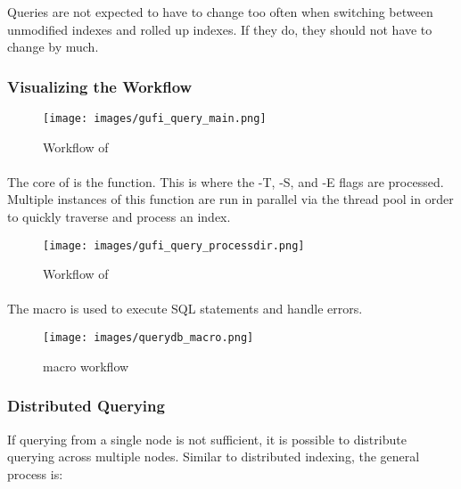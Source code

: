 Queries are not expected to have to change too often when switching
between unmodified indexes and rolled up indexes. If they do, they
should not have to change by much.

\subsubsection{Visualizing the Workflow}
\begin{figure}[H]
  \centering
  \texttt{[image: images/gufi\_query\_main.png]}
  \caption{Workflow of \gufiquery}
\end{figure}

\paragraph{\processdir}
The core of \gufiquery is the \processdir function. This is where the
-T, -S, and -E flags are processed. Multiple instances of this
function are run in parallel via the thread pool in order to quickly
traverse and process an index.

\begin{figure}[H]
  \centering
  \texttt{[image: images/gufi\_query\_processdir.png]}
  \caption{Workflow of \processdir}
\end{figure}

\paragraph{\querydb}
The \querydb macro is used to execute SQL statements and handle errors.

\begin{figure}[H]
  \centering
  \texttt{[image: images/querydb\_macro.png]}
  \caption{\querydb macro workflow}
\end{figure}

\subsubsection{Distributed Querying}
If querying from a single node is not sufficient, it is possible to
distribute querying across multiple nodes. Similar to distributed
indexing, the general process is:

